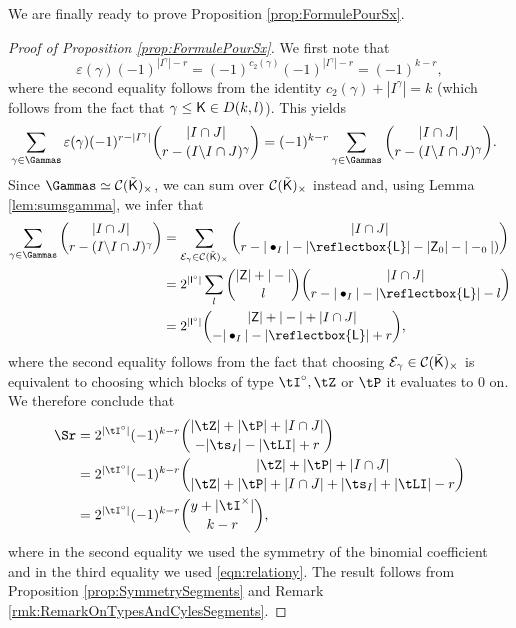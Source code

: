 \documentclass[11pt, a4paper, oneside, reqno]{amsart}
\newcommand{\sK}{{\sf K}}
\theoremstyle{remark}
\theoremstyle{definition}
\numberwithin{equation}{section}
\begin{document}
We are finally ready to prove Proposition \ref{prop:FormulePourSx}.
\begin{proof}[Proof of Proposition \ref{prop:FormulePourSx}]
We first note that
$$
	\varepsilon(\gamma)(-1)^{|I^{\gamma}|-r}=(-1)^{c_2(\gamma)}(-1)^{|I^{\gamma}|-r} = (-1)^{k-r},
$$
where the second equality follows from the  identity $c_2(\gamma) + |I^\gamma| = k$ (which follows from the fact that $\gamma \leq {\sf K} \in D(k,l)$).
This yields
\begin{align*}
	 & \sum_{\gamma \in \Gammas }\varepsilon(\gamma)(-1)^{r-|I^{\gamma}|}\binom{|I\cap J|}{r-(I\backslash I \cap J)^\gamma} =(-1)^{k-r}\sum_{\gamma \in \Gammas}\binom{|I\cap J|}{r-(I\backslash I \cap J)^\gamma}.
\end{align*}
Since $\Gammas \simeq \mathcal{C}(\tilde{\sK})_\times$, we can sum over $\mathcal{C}(\tilde{\sK})_\times$ instead and, using Lemma \ref{lem:sumsgamma}, we infer that
\begin{align*}
	\sum_{\gamma \in  \Gammas}\binom{|I\cap J|}{r-(I\backslash I \cap J)^\gamma} & = \sum_{\mathcal{E}_{\gamma} \in  \mathcal{C}(\tilde{\sf K})_\times}\binom{|I\cap J|}{r-|\bullet_I|-|\reflectbox{\sf L}|-|{\sf Z}_0|-|-_0|)} \\& =2^{|{\sf I}^{\circ}|}\sum_{l}\binom{|{\sf Z}|+|-|}{l}\binom{|I\cap J|}{r-|\bullet_I|-|\reflectbox{\sf L}|-l} \\
	                                                                                                                              & =2^{|{\sf I}^{\circ}|}\binom{|{\sf Z}|+|-|+|I\cap J|}{-|\bullet_I|-|\reflectbox{\sf L}|+r},
\end{align*}
where the second equality follows from the fact that choosing $\mathcal{E}_\gamma \in \mathcal{C}(\tilde{\sK})_\times $ is equivalent to choosing which blocks of type $\tI^\circ, \tZ$ or $\tP$ it evaluates to 0 on.
We therefore conclude that
\begin{align*}
	\Sr & =2^{|\tI^{\circ}|}(-1)^{k-r}\binom{|\tZ|+|\tP|+|I\cap J|}{-|\ts_I|-|\tLI|+r}                        \\
	              & =2^{|{\tI}^{\circ}|}(-1)^{k-r}\binom{|\tZ|+|\tP|+|I\cap J|}{|{\tZ}|+|\tP|+|I\cap J|+|\ts_I|+|\tLI|-r} \\
	              & =2^{|{\tI}^{\circ}|}(-1)^{k-r}\binom{y+ |{\tI^\times|}}{k-r},
\end{align*}
where in the second equality we used the symmetry of the binomial coefficient and in the third equality we used \eqref{eqn:relationy}. The result follows from Proposition \ref{prop:SymmetrySegments} and Remark \ref{rmk:RemarkOnTypesAndCylesSegments}.
\end{proof}
\end{document}
